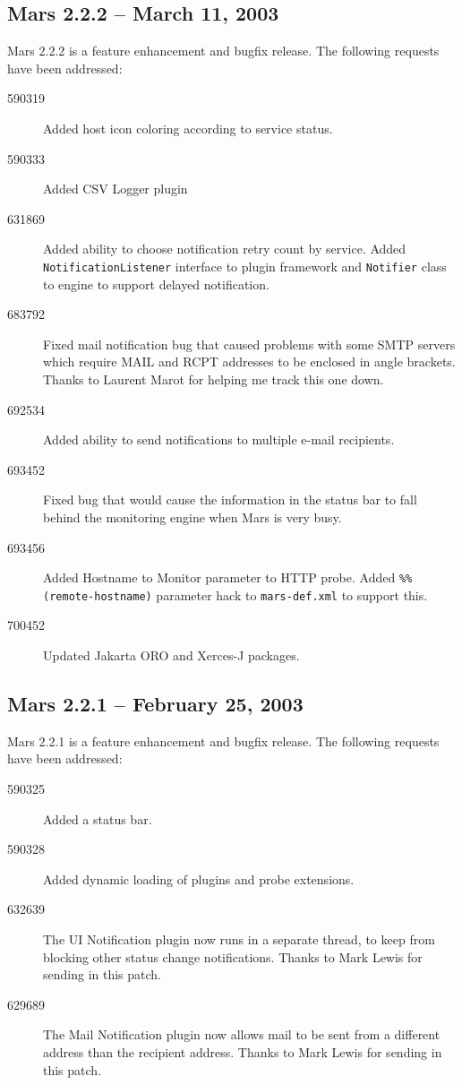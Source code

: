 \documentclass{article}
\newcommand{\filename}[1]{{\tt #1}}
\newcommand{\identifier}[1]{{\tt #1}}
\newcommand{\guiitem}[1]{{\sf #1}}
\begin{document}
\subsection{Mars 2.2.2 -- March 11, 2003}
Mars 2.2.2 is a feature enhancement and bugfix release. The following requests
have been addressed:
\begin{description}
\item[590319] Added host icon coloring according to service status.
\item[590333] Added CSV Logger plugin
\item[631869] Added ability to choose notification retry count by service.
Added \identifier{NotificationListener} interface to plugin framework and
\identifier{Notifier} class to engine to support delayed notification.
\item[683792] Fixed mail notification bug that caused problems with some SMTP
servers which require MAIL and RCPT addresses to be enclosed in angle brackets.
Thanks to Laurent Marot for helping me track this one down.
\item[692534] Added ability to send notifications to multiple e-mail recipients.
\item[693452] Fixed bug that would cause the information in the status bar to
fall behind the monitoring engine when Mars is very busy.
\item[693456] Added \guiitem{Hostname to Monitor} parameter to HTTP probe.
Added \identifier{\%\%(remote-hostname)} parameter hack to
\filename{mars-def.xml} to support this.
\item[700452] Updated Jakarta ORO and Xerces-J packages.
\end{description}

\subsection{Mars 2.2.1 -- February 25, 2003}
Mars 2.2.1 is a feature enhancement and bugfix release. The following requests
have been addressed:
\begin{description}
\item[590325] Added a status bar.
\item[590328] Added dynamic loading of plugins and probe extensions.
\item[632639] The UI Notification plugin now runs in a separate thread, to keep
from blocking other status change notifications. Thanks to Mark Lewis for
sending in this patch.
\item[629689] The Mail Notification plugin now allows mail to be sent from a
different address than the recipient address. Thanks to Mark Lewis for sending
in this patch.
\end{description}
\end{document}
